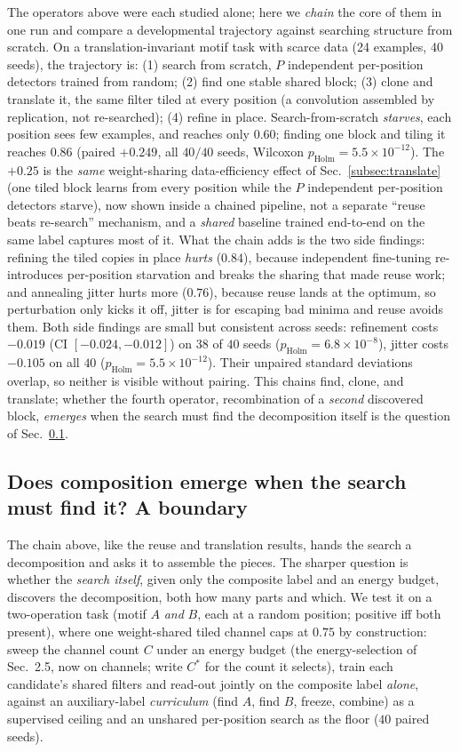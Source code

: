 \documentclass[11pt]{article}
\begin{document}
The operators above were each studied alone; here we \emph{chain} the core of them in one run and compare a
developmental trajectory against searching structure from scratch. On a translation-invariant motif task
with scarce data (24 examples, 40 seeds), the trajectory is: (1) search from scratch, $P$ independent
per-position detectors trained from random; (2) find one stable shared block; (3) clone and translate it,
the same filter tiled at every position (a convolution assembled by replication, not re-searched); (4)
refine in place. Search-from-scratch \emph{starves}, each position sees few examples, and reaches only
$0.60$; finding one block and tiling it reaches $0.86$ (paired $+0.249$, all $40/40$ seeds,
Wilcoxon $p_{\mathrm{Holm}}{=}5.5{\times}10^{-12}$). The $+0.25$ is the \emph{same} weight-sharing data-efficiency effect of
Sec.~\ref{subsec:translate} (one tiled block learns from every position while the $P$ independent per-position
detectors starve), now shown inside a chained pipeline, not a separate ``reuse beats re-search''
mechanism, and a \emph{shared} baseline trained end-to-end on the same label captures most of it.
What the chain adds is the two side
findings: refining the tiled copies in place \emph{hurts} ($0.84$), because independent fine-tuning
re-introduces per-position starvation and breaks the sharing that made reuse work; and annealing jitter
hurts more ($0.76$), because reuse lands at the optimum, so perturbation only kicks it off, jitter is for
escaping bad minima and reuse avoids them. Both side findings are small but consistent across seeds:
refinement costs $-0.019$ (CI $[-0.024,-0.012]$) on $38$ of $40$ seeds
($p_{\mathrm{Holm}}{=}6.8{\times}10^{-8}$), jitter costs $-0.105$ on all $40$
($p_{\mathrm{Holm}}{=}5.5{\times}10^{-12}$). Their unpaired standard deviations overlap, so neither is
visible without pairing. This chains find, clone, and translate; whether the fourth
operator, recombination of a \emph{second} discovered block, \emph{emerges} when the search must find the
decomposition itself is the question of Sec.~\ref{subsec:compose}.

\subsection{Does composition emerge when the search must find it? A boundary}\label{subsec:compose}

The chain above, like the reuse and translation results, hands the search a decomposition and asks it to
assemble the pieces. The sharper question is whether the \emph{search itself}, given only the composite
label and an energy budget, discovers the decomposition, both how many parts and which. We test it on a
two-operation task (motif $A$ \emph{and} $B$, each at a random position; positive iff both present), where
one weight-shared tiled channel caps at $0.75$ by construction: sweep the channel count $C$ under an energy
budget (the energy-selection of Sec.~2.5, now on channels; write $C^\ast$ for the count it selects),
train each candidate's shared filters and
read-out jointly on the composite label \emph{alone}, against an auxiliary-label \emph{curriculum} (find
$A$, find $B$, freeze, combine) as a supervised ceiling and an unshared per-position search as the floor
($40$ paired seeds).
\end{document}
